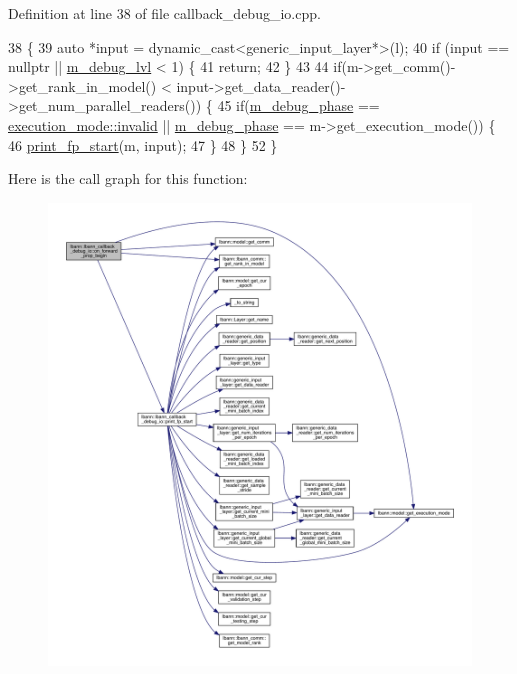 Definition at line 38 of file callback\+\_\+debug\+\_\+io.\+cpp.


\begin{DoxyCode}
38                                                                            \{
39   \textcolor{keyword}{auto} *input = \textcolor{keyword}{dynamic\_cast<}generic\_input\_layer*\textcolor{keyword}{>}(l);
40   \textcolor{keywordflow}{if} (input == \textcolor{keyword}{nullptr} || \hyperlink{classlbann_1_1lbann__callback__debug__io_adfd537a09e80aaa0887e5226dc52c13c}{m\_debug\_lvl} < 1) \{
41     \textcolor{keywordflow}{return};
42   \}
43 
44   \textcolor{keywordflow}{if}(m->get\_comm()->get\_rank\_in\_model() < input->get\_data\_reader()->get\_num\_parallel\_readers()) \{
45     \textcolor{keywordflow}{if}(\hyperlink{classlbann_1_1lbann__callback__debug__io_add73fbc786ca9284fa3399a7e99d0b1f}{m\_debug\_phase} == \hyperlink{base_8hpp_a2781a159088df64ed7d47cc91c4dc0a8afedb2d84cafe20862cb4399751a8a7e3}{execution\_mode::invalid} || 
      \hyperlink{classlbann_1_1lbann__callback__debug__io_add73fbc786ca9284fa3399a7e99d0b1f}{m\_debug\_phase} == m->get\_execution\_mode()) \{
46       \hyperlink{classlbann_1_1lbann__callback__debug__io_a3c9897a583441381f82a11246aea4424}{print\_fp\_start}(m, input);
47     \}
48   \}
52 \}
\end{DoxyCode}
Here is the call graph for this function\+:\nopagebreak
\begin{figure}[H]
\begin{center}
\leavevmode
\includegraphics[width=350pt]{classlbann_1_1lbann__callback__debug__io_aa31ee265d40edff982ebf38054394927_cgraph}
\end{center}
\end{figure}
